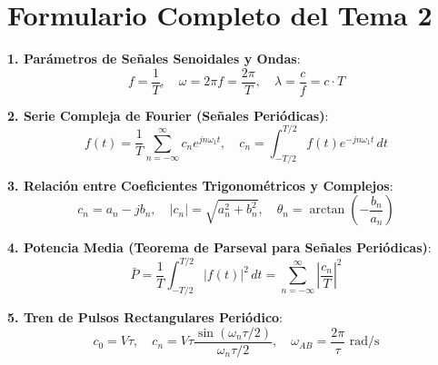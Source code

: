 \section{Formulario Completo del Tema 2}

\begin{tcolorbox}[cajaFormulario, title={Formulario General: Señales y Series de Fourier}]
\textbf{1. Parámetros de Señales Senoidales y Ondas}:
\[
f = \frac{1}{T}, \quad \omega = 2\pi f = \frac{2\pi}{T}, \quad \lambda = \frac{c}{f} = c \cdot T
\]

\textbf{2. Serie Compleja de Fourier (Señales Periódicas)}:
\[
f(t) = \frac{1}{T} \sum_{n=-\infty}^{\infty} c_n e^{j n \omega_1 t}, \quad c_n = \int_{-T/2}^{T/2} f(t) e^{-j n \omega_1 t} \, dt
\]

\textbf{3. Relación entre Coeficientes Trigonométricos y Complejos}:
\[
c_n = a_n - j b_n, \quad |c_n| = \sqrt{a_n^2 + b_n^2}, \quad \theta_n = \arctan\left(-\frac{b_n}{a_n}\right)
\]

\textbf{4. Potencia Media (Teorema de Parseval para Señales Periódicas)}:
\[
\bar{P} = \frac{1}{T} \int_{-T/2}^{T/2} |f(t)|^2 \, dt = \sum_{n=-\infty}^{\infty} \left|\frac{c_n}{T}\right|^2
\]

\textbf{5. Tren de Pulsos Rectangulares Periódico}:
\[
c_0 = V\tau, \quad c_n = V\tau \frac{\sin(\omega_n \tau / 2)}{\omega_n \tau / 2}, \quad \omega_{AB} = \frac{2\pi}{\tau} \text{ rad/s}
\]
\end{tcolorbox}

\newpage

